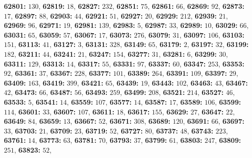 \textsf{\bfseries 62801:} $130$, \textsf{\bfseries 62819:} $18$, \textsf{\bfseries 62827:} $232$, \textsf{\bfseries 62851:} $75$, \textsf{\bfseries 62861:} $66$, \textsf{\bfseries 62869:} $92$, \textsf{\bfseries 62873:} $17$, \textsf{\bfseries 62897:} $88$, \textsf{\bfseries 62903:} $44$, \textsf{\bfseries 62921:} $51$, \textsf{\bfseries 62927:} $20$, \textsf{\bfseries 62929:} $212$, \textsf{\bfseries 62939:} $21$, \textsf{\bfseries 62969:} $96$, \textsf{\bfseries 62971:} $19$, \textsf{\bfseries 62981:} $139$, \textsf{\bfseries 62983:} $5$, \textsf{\bfseries 62987:} $33$, \textsf{\bfseries 62989:} $10$, \textsf{\bfseries 63029:} $66$, \textsf{\bfseries 63031:} $65$, \textsf{\bfseries 63059:} $57$, \textsf{\bfseries 63067:} $17$, \textsf{\bfseries 63073:} $276$, \textsf{\bfseries 63079:} $31$, \textsf{\bfseries 63097:} $106$, \textsf{\bfseries 63103:} $151$, \textsf{\bfseries 63113:} $41$, \textsf{\bfseries 63127:} $3$, \textsf{\bfseries 63131:} $328$, \textsf{\bfseries 63149:} $65$, \textsf{\bfseries 63179:} $2$, \textsf{\bfseries 63197:} $32$, \textsf{\bfseries 63199:} $182$, \textsf{\bfseries 63211:} $44$, \textsf{\bfseries 63241:} $21$, \textsf{\bfseries 63247:} $154$, \textsf{\bfseries 63277:} $31$, \textsf{\bfseries 63281:} $6$, \textsf{\bfseries 63299:} $30$, \textsf{\bfseries 63311:} $129$, \textsf{\bfseries 63313:} $14$, \textsf{\bfseries 63317:} $55$, \textsf{\bfseries 63331:} $97$, \textsf{\bfseries 63337:} $60$, \textsf{\bfseries 63347:} $253$, \textsf{\bfseries 63353:} $92$, \textsf{\bfseries 63361:} $37$, \textsf{\bfseries 63367:} $228$, \textsf{\bfseries 63377:} $101$, \textsf{\bfseries 63389:} $264$, \textsf{\bfseries 63391:} $109$, \textsf{\bfseries 63397:} $29$, \textsf{\bfseries 63409:} $163$, \textsf{\bfseries 63419:} $399$, \textsf{\bfseries 63421:} $65$, \textsf{\bfseries 63439:} $19$, \textsf{\bfseries 63443:} $102$, \textsf{\bfseries 63463:} $43$, \textsf{\bfseries 63467:} $42$, \textsf{\bfseries 63473:} $66$, \textsf{\bfseries 63487:} $56$, \textsf{\bfseries 63493:} $259$, \textsf{\bfseries 63499:} $208$, \textsf{\bfseries 63521:} $214$, \textsf{\bfseries 63527:} $46$, \textsf{\bfseries 63533:} $5$, \textsf{\bfseries 63541:} $14$, \textsf{\bfseries 63559:} $107$, \textsf{\bfseries 63577:} $14$, \textsf{\bfseries 63587:} $17$, \textsf{\bfseries 63589:} $106$, \textsf{\bfseries 63599:} $114$, \textsf{\bfseries 63601:} $33$, \textsf{\bfseries 63607:} $107$, \textsf{\bfseries 63611:} $18$, \textsf{\bfseries 63617:} $155$, \textsf{\bfseries 63629:} $27$, \textsf{\bfseries 63647:} $22$, \textsf{\bfseries 63649:} $84$, \textsf{\bfseries 63659:} $13$, \textsf{\bfseries 63667:} $52$, \textsf{\bfseries 63671:} $308$, \textsf{\bfseries 63689:} $120$, \textsf{\bfseries 63691:} $66$, \textsf{\bfseries 63697:} $33$, \textsf{\bfseries 63703:} $21$, \textsf{\bfseries 63709:} $23$, \textsf{\bfseries 63719:} $52$, \textsf{\bfseries 63727:} $80$, \textsf{\bfseries 63737:} $48$, \textsf{\bfseries 63743:} $223$, \textsf{\bfseries 63761:} $14$, \textsf{\bfseries 63773:} $63$, \textsf{\bfseries 63781:} $70$, \textsf{\bfseries 63793:} $37$, \textsf{\bfseries 63799:} $61$, \textsf{\bfseries 63803:} $247$, \textsf{\bfseries 63809:} $251$, \textsf{\bfseries 63823:} $52$, 
